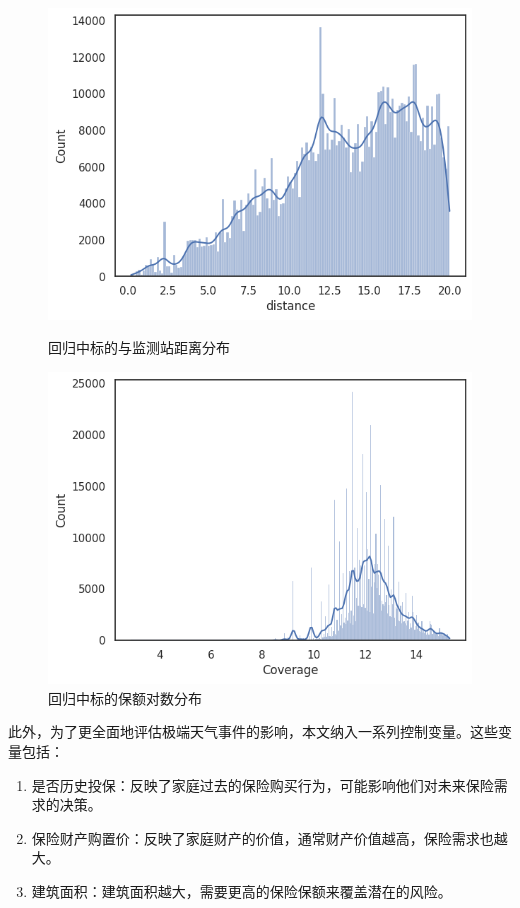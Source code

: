 \begin{figure}[H]
    \begin{minipage}{0.48\linewidth}
        \includegraphics[width=\linewidth]{lib/img/olsdistance.png}
        \caption{回归中标的与监测站距离分布}
    \end{minipage}
    \begin{minipage}{0.48\linewidth}
        \includegraphics[width=\linewidth]{lib/img/coverage.png}
        \caption{回归中标的保额对数分布}
    \end{minipage}
\end{figure}

此外，为了更全面地评估极端天气事件的影响，本文纳入一系列控制变量。这些变量包括：
\begin{enumerate}
    \item 是否历史投保：反映了家庭过去的保险购买行为，可能影响他们对未来保险需求的决策。
    \item 保险财产购置价：反映了家庭财产的价值，通常财产价值越高，保险需求也越大。
    \item 建筑面积：建筑面积越大，需要更高的保险保额来覆盖潜在的风险。
\end{enumerate}

